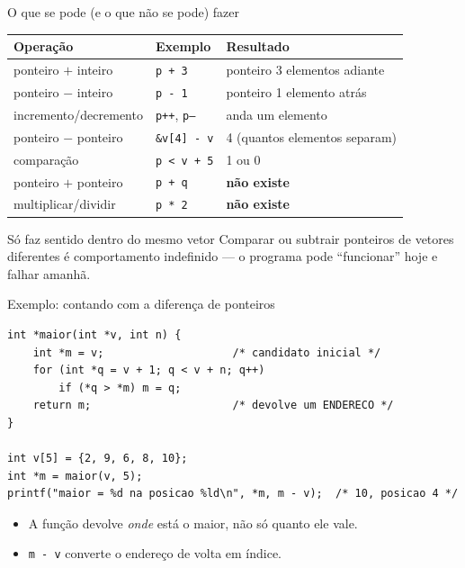 \documentclass[aspectratio=169]{beamer}
\begin{document}
\begin{frame}{O que se pode (e o que não se pode) fazer}
  \begin{center}
  \footnotesize
  \begin{tabular}{lll}
    \toprule
    Operação & Exemplo & Resultado \\
    \midrule
    ponteiro $+$ inteiro   & \texttt{p + 3}   & ponteiro 3 elementos adiante \\
    ponteiro $-$ inteiro   & \texttt{p - 1}   & ponteiro 1 elemento atrás \\
    incremento/decremento  & \texttt{p++}, \texttt{p--} & anda um elemento \\
    ponteiro $-$ ponteiro  & \texttt{\&v[4] - v} & 4 (quantos elementos separam) \\
    comparação             & \texttt{p < v + 5} & 1 ou 0 \\
    \midrule
    ponteiro $+$ ponteiro  & \texttt{p + q}   & \textbf{não existe} \\
    multiplicar/dividir    & \texttt{p * 2}   & \textbf{não existe} \\
    \bottomrule
  \end{tabular}
  \end{center}
  \begin{alertblock}{Só faz sentido dentro do mesmo vetor}
    Comparar ou subtrair ponteiros de vetores diferentes é comportamento
    indefinido --- o programa pode ``funcionar'' hoje e falhar amanhã.
  \end{alertblock}
\end{frame}

\begin{frame}[fragile]{Exemplo: contando com a diferença de ponteiros}
\begin{lstlisting}
int *maior(int *v, int n) {
    int *m = v;                    /* candidato inicial */
    for (int *q = v + 1; q < v + n; q++)
        if (*q > *m) m = q;
    return m;                      /* devolve um ENDERECO */
}

int v[5] = {2, 9, 6, 8, 10};
int *m = maior(v, 5);
printf("maior = %d na posicao %ld\n", *m, m - v);  /* 10, posicao 4 */
\end{lstlisting}
  \begin{itemize}
    \item A função devolve \emph{onde} está o maior, não só quanto ele vale.
    \item \texttt{m - v} converte o endereço de volta em índice.
  \end{itemize}
\end{frame}
\end{document}

